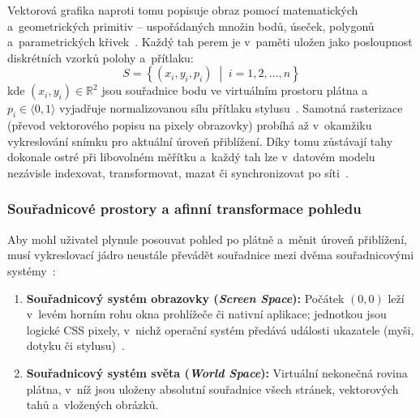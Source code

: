 \documentclass[12pt, a4paper, oneside]{article}
\begin{document}
Vektorová grafika naproti tomu popisuje obraz pomocí matematických a~geometrických primitiv -- uspořádaných množin bodů, úseček, polygonů a~parametrických křivek~\cite{marschner2021cg}. Každý tah perem je v~paměti uložen jako posloupnost diskrétních vzorků polohy a~přítlaku:
\begin{equation}
    S = \left\{ (x_i, y_i, p_i) \;\middle|\; i = 1, 2, \dots, n \right\}
    \label{eq:stroke_samples}
\end{equation}
kde $(x_i, y_i) \in \mathbb{R}^2$ jsou souřadnice bodu ve virtuálním prostoru plátna a~$p_i \in \langle 0, 1 \rangle$ vyjadřuje normalizovanou sílu přítlaku stylusu~\cite{w3c_pointer}. Samotná rasterizace (převod vektorového popisu na pixely obrazovky) probíhá až v~okamžiku vykreslování snímku pro aktuální úroveň přiblížení. Díky tomu zůstávají tahy dokonale ostré při libovolném měřítku a~každý tah lze v~datovém modelu nezávisle indexovat, transformovat, mazat či synchronizovat po síti~\cite{marschner2021cg, mdn_canvas}.

\subsubsection{Souřadnicové prostory a afinní transformace pohledu}
\label{sec:teorie_transformace}

Aby mohl uživatel plynule posouvat pohled po plátně a~měnit úroveň přiblížení, musí vykreslovací jádro neustále převádět souřadnice mezi dvěma souřadnicovými systémy~\cite{marschner2021cg}:
\begin{enumerate}
    \item \textbf{Souřadnicový systém obrazovky (\textit{Screen Space}):} Počátek $(0, 0)$ leží v~levém horním rohu okna prohlížeče či nativní aplikace; jednotkou jsou logické CSS pixely, v~nichž operační systém předává události ukazatele (myši, dotyku či stylusu)~\cite{w3c_pointer}.
    \item \textbf{Souřadnicový systém světa (\textit{World Space}):} Virtuální nekonečná rovina plátna, v~níž jsou uloženy absolutní souřadnice všech stránek, vektorových tahů a~vložených obrázků.
\end{enumerate}
\end{document}
